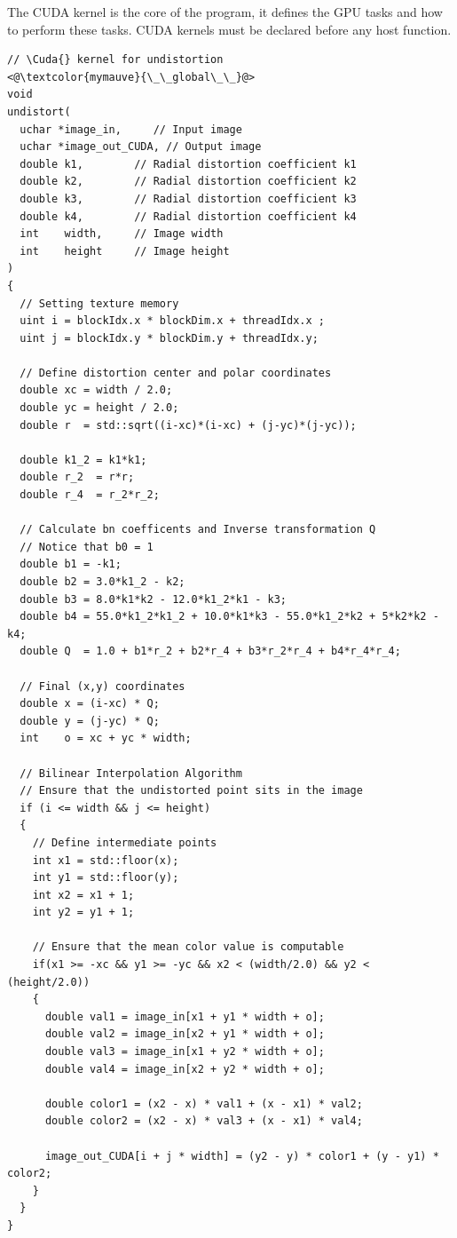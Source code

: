 \documentclass[12pt]{article}
\newcommand*{\Cuda}{\textsc{CUDA}}
\begin{document}
The \Cuda{} kernel is the core of the program, it defines the GPU tasks and how to perform these tasks. \Cuda{} kernels must be declared before any host function.
%
\begin{lstlisting}
// \Cuda{} kernel for undistortion
<@\textcolor{mymauve}{\_\_global\_\_}@>
void
undistort(
  uchar *image_in,     // Input image
  uchar *image_out_CUDA, // Output image
  double k1,        // Radial distortion coefficient k1
  double k2,        // Radial distortion coefficient k2
  double k3,        // Radial distortion coefficient k3
  double k4,        // Radial distortion coefficient k4
  int    width,     // Image width
  int    height     // Image height
)
{
  // Setting texture memory
  uint i = blockIdx.x * blockDim.x + threadIdx.x ;
  uint j = blockIdx.y * blockDim.y + threadIdx.y;

  // Define distortion center and polar coordinates
  double xc = width / 2.0;
  double yc = height / 2.0;
  double r  = std::sqrt((i-xc)*(i-xc) + (j-yc)*(j-yc));

  double k1_2 = k1*k1;
  double r_2  = r*r;
  double r_4  = r_2*r_2;

  // Calculate bn coefficents and Inverse transformation Q
  // Notice that b0 = 1
  double b1 = -k1;
  double b2 = 3.0*k1_2 - k2;
  double b3 = 8.0*k1*k2 - 12.0*k1_2*k1 - k3;
  double b4 = 55.0*k1_2*k1_2 + 10.0*k1*k3 - 55.0*k1_2*k2 + 5*k2*k2 - k4;
  double Q  = 1.0 + b1*r_2 + b2*r_4 + b3*r_2*r_4 + b4*r_4*r_4;

  // Final (x,y) coordinates
  double x = (i-xc) * Q;
  double y = (j-yc) * Q;
  int    o = xc + yc * width;

  // Bilinear Interpolation Algorithm
  // Ensure that the undistorted point sits in the image
  if (i <= width && j <= height)
  {
    // Define intermediate points
    int x1 = std::floor(x);
    int y1 = std::floor(y);
    int x2 = x1 + 1;
    int y2 = y1 + 1;

    // Ensure that the mean color value is computable
    if(x1 >= -xc && y1 >= -yc && x2 < (width/2.0) && y2 < (height/2.0))
    {
      double val1 = image_in[x1 + y1 * width + o];
      double val2 = image_in[x2 + y1 * width + o];
      double val3 = image_in[x1 + y2 * width + o];
      double val4 = image_in[x2 + y2 * width + o];

      double color1 = (x2 - x) * val1 + (x - x1) * val2;
      double color2 = (x2 - x) * val3 + (x - x1) * val4;

      image_out_CUDA[i + j * width] = (y2 - y) * color1 + (y - y1) * color2;
    }
  }
}
\end{lstlisting}
\end{document}
